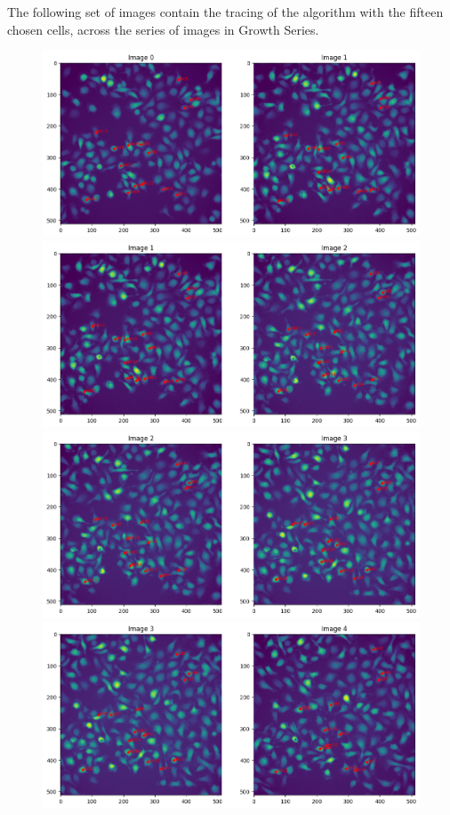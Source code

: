 \documentclass{article}
\begin{document}
The following set of images contain the tracing of the algorithm with the fifteen chosen cells, across the series of images in Growth Series. 
\begin{figure}[h!]
\centering
\includegraphics[width=0.75\linewidth]{Report/RImages/Traces_Growth/trace-b1.png}
\includegraphics[width=0.75\linewidth]{Report/RImages/Traces_Growth/trace-b2.png}
\includegraphics[width=0.75\linewidth]{Report/RImages/Traces_Growth/trace-b3.png}
\includegraphics[width=0.75\linewidth]{Report/RImages/Traces_Growth/trace-b4.png}
\end{figure}
\end{document}
